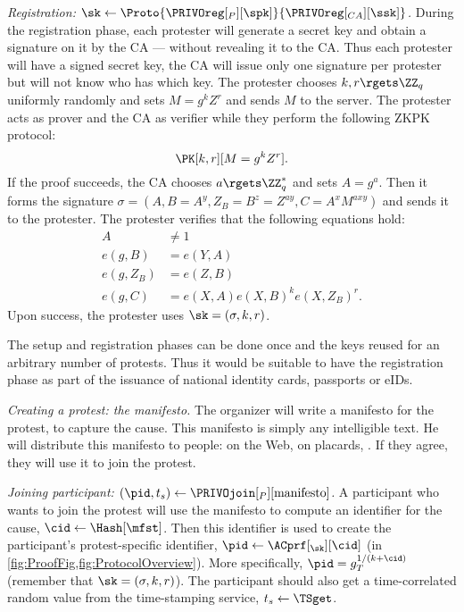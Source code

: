 
\emph{Registration: \(\sk\gets 
    \Proto{\PRIVOreg[_P][\spk]}{\PRIVOreg[_{CA}][\ssk]}\).}
During the registration phase, each protester will generate a secret key and 
obtain a signature on it by the \ac{CA} --- without revealing it to the \ac{CA}.
Thus each protester will have a signed secret key, the \ac{CA} will issue only 
one signature per protester but will not know who has which key.
The protester chooses \(k, r\rgets \ZZ_q\) uniformly randomly and sets \(M = g^k 
  Z^r\) and sends \(M\) to the server.
The protester acts as prover and the \ac{CA} as verifier while they perform the 
following \ac{ZKPK} protocol:
\[
  \PK[k,r][M = g^k Z^r].
\]
If the proof succeeds, the \ac{CA} chooses \(a\rgets \ZZ_q^*\) and sets \(A = 
  g^a\).
Then it forms the signature \(\sigma = (A, B = A^y, Z_B = B^z = Z^{ay}, C = A^x 
  M^{axy})\) and sends it to the protester.
The protester verifies that the following equations hold:
\begin{align*}
  A &\neq 1 \\
  e(g, B) &= e(Y, A) \\
  e(g, Z_B) &= e(Z, B) \\
  e(g, C) &= e(X, A) e(X, B)^k e(X, Z_B)^r.
\end{align*}
Upon success, the protester uses \(\sk = (\sigma, k, r)\).

The setup and registration phases can be done once and the keys reused for an 
arbitrary number of protests.
Thus it would be suitable to have the registration phase as part of the issuance 
of \eg national identity cards, passports or \acp{eID}.

\emph{Creating a protest: the manifesto.}
The organizer will write a manifesto for the protest, \ie to capture the cause.
This manifesto is simply any intelligible text.
He will distribute this manifesto to people: on the Web, on placards, \etc.
If they agree, they will use it to join the protest.


\emph{Joining participant: \((\pid, t_s)\gets 
    \PRIVOjoin[_P][\text{manifesto}]\).}
A participant who wants to join the protest will use the manifesto to compute an 
identifier for the cause, \(\cid\gets \Hash[\mfst]\).
Then this identifier is used to create the participant's protest-specific 
identifier, \(\pid\gets \ACprf[_{\sk}][\cid]\) (in 
\cref{fig:ProofFig,fig:ProtocolOverview}).
More specifically, \(\pid = g_T^{1/(k+\cid)}\) (remember that \(\sk = (\sigma, 
  k, r)\)).
The participant should also get a time-correlated random value from the 
time-stamping service, \(t_s\gets \TSget\).

